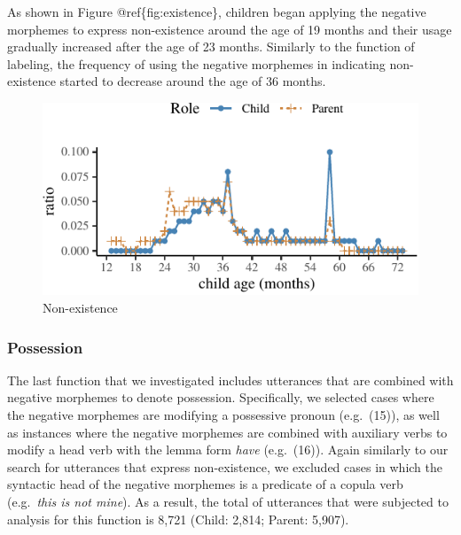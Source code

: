 \documentclass[10pt, letterpaper]{article}
\newenvironment{CodeChunk}{}{}
\begin{document}
As shown in Figure @ref\{fig:existence\}, children began applying the
negative morphemes to express non-existence around the age of 19 months
and their usage gradually increased after the age of 23 months.
Similarly to the function of labeling, the frequency of using the
negative morphemes in indicating non-existence started to decrease
around the age of 36 months.

\begin{CodeChunk}
\begin{figure}[H]

{\centering \includegraphics{figs/existence-1} 

}

\caption[Non-existence]{Non-existence}\label{fig:existence}
\end{figure}
\end{CodeChunk}

\hypertarget{possession}{%
\subsubsection{Possession}\label{possession}}

The last function that we investigated includes utterances that are
combined with negative morphemes to denote possession. Specifically, we
selected cases where the negative morphemes are modifying a possessive
pronoun (e.g.~(15)), as well as instances where the negative morphemes
are combined with auxiliary verbs to modify a head verb with the lemma
form \emph{have} (e.g.~(16)). Again similarly to our search for
utterances that express non-existence, we excluded cases in which the
syntactic head of the negative morphemes is a predicate of a copula verb
(e.g.~\emph{this is not mine}). As a result, the total of utterances
that were subjected to analysis for this function is 8,721 (Child:
2,814; Parent: 5,907).
\end{document}
